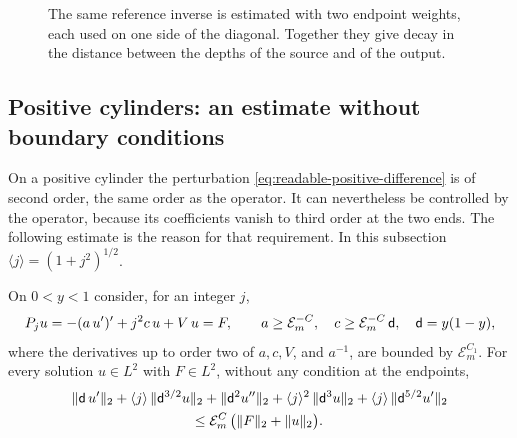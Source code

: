 \begin{figure}[htbp]
\centering
{}
\caption{The same reference inverse is estimated with two endpoint
weights, each used on one side of the diagonal. Together they give
decay in the distance between the depths of the source and of the
output.}
\label{fig:two-weights}
\end{figure}

\subsection{Positive cylinders: an estimate without boundary conditions}
\label{subsec:cubic-estimate}

On a positive cylinder the perturbation
\eqref{eq:readable-positive-difference} is of second order, the same
order as the operator. It can nevertheless be controlled by the
operator, because its coefficients vanish to third order at the two
ends. The following estimate is the reason for that requirement. In
this subsection $\langle j\rangle=(1+j^2)^{1/2}$.

\begin{lemma}\label{lem:cubic}
On $0<y<1$ consider, for an integer $j$,
\[
 P_ju=-(a\,u')'+j^2c\,u+V\,u=F,
 \qquad a\ge\mathcal E_m^{-C},\quad
 c\ge\mathcal E_m^{-C}\,\mathsf d,\quad \mathsf d=y(1-y),
\]
where the derivatives up to order two of $a,c,V$, and $a^{-1}$, are
bounded by $\mathcal E_m^{C_1}$. For every solution
$u\in L^2$ with $F\in L^2$, without any condition at the endpoints,
\begin{equation}\label{eq:vol-arbitrary-boundary-graph-bound}
 \begin{split}
 &\|\bd\,u'\|_2+\langle j\rangle\,\|\bd^{3/2}u\|_2+\|\bd^{2}u''\|_2
   +\langle j\rangle^2\,\|\bd^{3}u\|_2
   +\langle j\rangle\,\|\bd^{5/2}u'\|_2\\
 &\hspace{30mm}\le\mathcal E_m^C\,\bigl(\|F\|_2+\|u\|_2\bigr).
 \end{split}
\end{equation}
\end{lemma}


